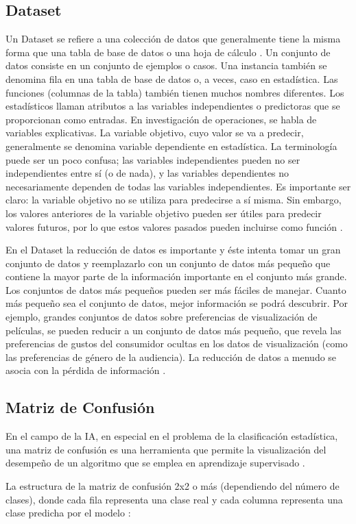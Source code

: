 \subsection{Dataset}
Un Dataset se refiere a una colección de datos que generalmente tiene la misma forma que una tabla de base de datos o una hoja de cálculo \cite{Astudillo2021}. Un conjunto de datos consiste en un conjunto de ejemplos o casos. Una instancia también se denomina fila en una tabla de base de datos o, a veces, caso en estadística. Las funciones (columnas de la tabla) también tienen muchos nombres diferentes. Los estadísticos llaman atributos a las variables independientes o predictoras que se proporcionan como entradas. En investigación de operaciones, se habla de variables explicativas. La variable objetivo, cuyo valor se va a predecir, generalmente se denomina variable dependiente en estadística. La terminología puede ser un poco confusa; las variables independientes pueden no ser independientes entre sí (o de nada), y las variables dependientes no necesariamente dependen de todas las variables independientes. Es importante ser claro: la variable objetivo no se utiliza para predecirse a sí misma. Sin embargo, los valores anteriores de la variable objetivo pueden ser útiles para predecir valores futuros, por lo que estos valores pasados pueden incluirse como función \cite{provost2013data}.\\
\par En el Dataset la reducción de datos es importante y éste intenta tomar un gran conjunto de datos y reemplazarlo con un conjunto de datos más pequeño que contiene la mayor parte de la información importante en el conjunto más grande. Los conjuntos de datos más pequeños pueden ser más fáciles de manejar. Cuanto más pequeño sea el conjunto de datos, mejor información se podrá descubrir. Por ejemplo, grandes conjuntos de datos sobre preferencias de visualización de películas, se pueden reducir a un conjunto de datos más pequeño, que revela las preferencias de gustos del consumidor ocultas en los datos de visualización (como las preferencias de género de la audiencia). La reducción de datos a menudo se asocia con la pérdida de información \cite{provost2013data}.\\

\doublespacing
\subsection{Matriz de Confusión}
\label{sec:mc}
En el campo de la IA, en especial en el problema de la clasificación estadística, una matriz de confusión es una herramienta que permite la visualización del desempeño de un algoritmo que se emplea en aprendizaje supervisado .
\par La estructura de la matriz de confusión 2x2 o más (dependiendo del número de clases), donde cada fila representa una clase real y cada columna representa una clase predicha por el modelo \cite{Harrington2012}:

